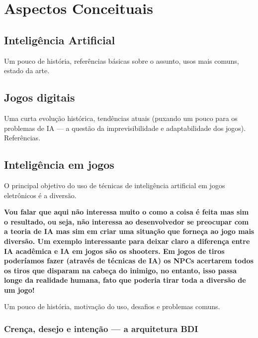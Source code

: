 \chapter{Aspectos Conceituais}

\section{Inteligência Artificial}

Um pouco de história, referências básicas sobre o assunto, usos mais
comuns, estado da arte.

\section{Jogos digitais}


Uma curta evolução histórica, tendências atuais (puxando um pouco para
os problemas de IA --- a questão da imprevisibilidade e adaptabilidade
dos jogos). Referências.

\section{Inteligência em jogos}

O principal objetivo do uso de técnicas de inteligência artificial em jogos eletrônicos é a diversão.

\textbf{Vou falar que aqui não interessa muito o como a coisa é feita mas sim o resultado, ou seja, não interessa ao desenvolvedor se preocupar com a teoria de IA mas sim em criar uma situação que forneça ao jogo mais diversão.
Um exemplo interessante para deixar claro a diferença entre IA acadêmica e IA em jogos são os shooters. Em jogos de tiros poderíamos fazer (através de técnicas de IA) os NPCs acertarem todos os tiros que disparam na cabeça do inimigo, no entanto, isso passa longe da realidade humana, fato que poderia tirar toda a diversão de um jogo!}

Um pouco de história, motivação do uso, desafios e problemas comuns.

\subsection{Crença, desejo e intenção --- a arquitetura BDI}

